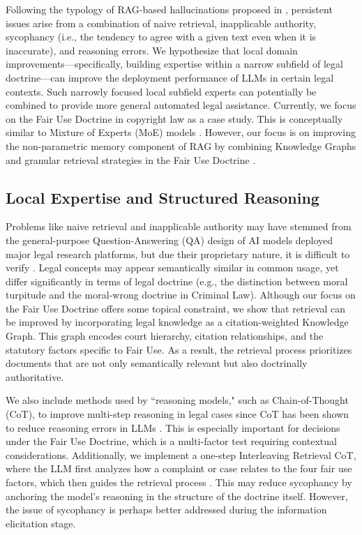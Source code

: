 Following the typology of RAG-based hallucinations proposed in \cite{04b_HallucinationFree}, persistent issues arise from a combination of naive retrieval, inapplicable authority, sycophancy (i.e., the tendency to agree with a given text even when it is inaccurate), and reasoning errors. We hypothesize that local domain improvements—specifically, building expertise within a narrow subfield of legal doctrine—can improve the deployment performance of LLMs in certain legal contexts. Such narrowly focused local subfield experts can potentially be combined to provide more general automated legal assistance. Currently, we focus on the Fair Use Doctrine in copyright law as a case study.  This is conceptually similar to Mixture of Experts (MoE) models \cite{13_AdaptiveMoE}. However, our focus is on improving the non-parametric memory component of RAG by combining Knowledge Graphs and granular retrieval strategies in the Fair Use Doctrine \cite{23_NonParametricRAGContinualLearning, 01_UnifyingKGwithLLM, 03b_SemanticRepresentationContextual, 02_DenseRetrieval}.

\subsection{Local Expertise and Structured Reasoning}

Problems like naive retrieval and inapplicable authority may have stemmed from the general-purpose Question-Answering (QA) design of AI models deployed major legal research platforms, but due their proprietary nature, it is difficult to verify \cite{04b_HallucinationFree}. Legal concepts may appear semantically similar in common usage, yet differ significantly in terms of legal doctrine (e.g., the distinction between moral turpitude and the moral-wrong doctrine in Criminal Law). Although our focus on the Fair Use Doctrine offers some topical constraint, we show that retrieval can be improved by incorporating legal knowledge as a citation-weighted Knowledge Graph. This graph encodes court hierarchy, citation relationships, and the statutory factors specific to Fair Use. As a result, the retrieval process prioritizes documents that are not only semantically relevant but also doctrinally authoritative.

We also include methods used by ``reasoning models," such as Chain-of-Thought (CoT), to improve multi-step reasoning in legal cases since CoT has been shown to reduce reasoning errors in LLMs \cite{08_CoT}. This is especially important for decisions under the Fair Use Doctrine, which is a multi-factor test requiring contextual considerations. Additionally, we implement a one-step Interleaving Retrieval CoT, where the LLM first analyzes how a complaint or case relates to the four fair use factors, which then guides the retrieval process \cite{28_CoTandIRCoT}. This may reduce sycophancy by anchoring the model’s reasoning in the structure of the doctrine itself. However, the issue of sycophancy is perhaps better addressed during the information elicitation stage.

